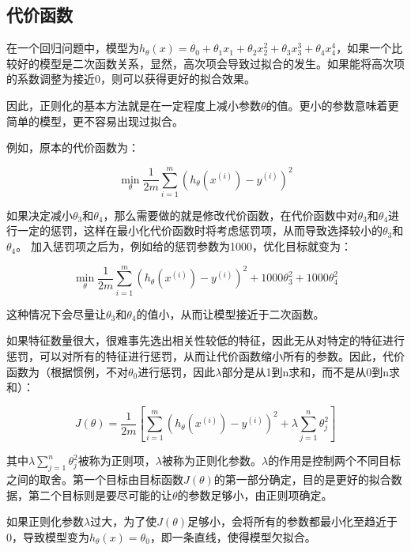 \documentclass[12pt, a4paper]{article}
\begin{document}
\subsection{代价函数}

在一个回归问题中，模型为$h_\theta(x) = \theta_0 + \theta_1x_1 + \theta_2x_2^2 + \theta_3x_3^3 + \theta_4x_4^4$，如果一个比较好的模型是二次函数关系，显然，高次项会导致过拟合的发生。如果能将高次项的系数调整为接近$0$，则可以获得更好的拟合效果。

因此，正则化的基本方法就是在一定程度上减小参数$\theta$的值。更小的参数意味着更简单的模型，更不容易出现过拟合。

例如，原本的代价函数为：

\begin{equation*}
    \mathop{min}\limits_\theta\frac{1}{2m}\sum_{i=1}^{m}(h_\theta(x^{(i)})-y^{(i)})^2
\end{equation*}

如果决定减小$\theta_3$和$\theta_4$，那么需要做的就是修改代价函数，在代价函数中对$\theta_3$和$\theta_4$进行一定的惩罚，这样在最小化代价函数时将考虑惩罚项，从而导致选择较小的$\theta_3$和$\theta_4$。
加入惩罚项之后为，例如给的惩罚参数为1000，优化目标就变为：

\begin{equation*}
    \mathop{min}\limits_\theta\frac{1}{2m}\sum_{i=1}^{m}(h_\theta(x^{(i)})-y^{(i)})^2+1000\theta_3^2+1000\theta_4^2
\end{equation*}

这种情况下会尽量让$\theta_3$和$\theta_4$的值小，从而让模型接近于二次函数。

如果特征数量很大，很难事先选出相关性较低的特征，因此无从对特定的特征进行惩罚，可以对所有的特征进行惩罚，从而让代价函数缩小所有的参数。因此，代价函数为（根据惯例，不对$\theta_0$进行惩罚，因此$\lambda$部分是从1到n求和，而不是从0到n求和）：

\begin{equation*}
    J(\theta) = \frac{1}{2m}\left[\sum_{i=1}^{m}(h_\theta(x^{(i)})-y^{(i)})^2 + \lambda\sum_{j=1}^n\theta_j^2\right]
\end{equation*}

其中$\lambda\sum_{j=1}^n\theta_j^2$被称为正则项，$\lambda$被称为正则化参数。$\lambda$的作用是控制两个不同目标之间的取舍。第一个目标由目标函数$J(\theta)$的第一部分确定，目的是更好的拟合数据，第二个目标则是要尽可能的让$\theta$的参数足够小，由正则项确定。

如果正则化参数$\lambda$过大，为了使$J(\theta)$足够小，会将所有的参数都最小化至趋近于0，导致模型变为$h_\theta(x)=\theta_0$，即一条直线，使得模型欠拟合。
\end{document}
